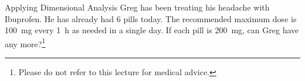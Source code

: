 \documentclass[10pt,letterpaper,twoside]{article}
\begin{document}
\clearpage

\begin{frame}[t]{Applying Dimensional Analysis}
	Greg has been treating his headache with Ibuprofen. He has already had 6
	pills today. The recommended maximum dose is \SI{100}{\milli\gram} every
	\SI{1}{h} as needed in a single day. If each pill is
	\SI{200}{\milli\gram}, can Greg have any more?\footnote{Please do not
	refer to this lecture for medical advice.}

\end{frame}
\end{document}

